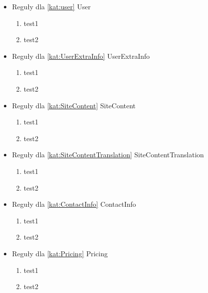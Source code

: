 \begin{itemize}[label={}]
    \setlength\itemsep{1em}
    \item Reguły dla \ref{kat:user} User
    \begin{enumerate}[label={\textbf{REG/\protect\threedigits{\arabic{enumi}}}}, wide, labelwidth=!]
        \item test1
        \item test2
    \end{enumerate}
    \item Reguły dla \ref{kat:UserExtraInfo} UserExtraInfo
    \begin{enumerate}[label={\textbf{REG/\protect\threedigits{\arabic{enumi}}}}, wide, labelwidth=!, resume]
        \item test1
        \item test2
    \end{enumerate}
    \item Reguły dla \ref{kat:SiteContent} SiteContent
    \begin{enumerate}[label={\textbf{REG/\protect\threedigits{\arabic{enumi}}}}, wide, labelwidth=!, resume]
        \item test1
        \item test2
    \end{enumerate}
    \item Reguły dla \ref{kat:SiteContentTranslation} SiteContentTranslation
    \begin{enumerate}[label={\textbf{REG/\protect\threedigits{\arabic{enumi}}}}, wide, labelwidth=!, resume]
        \item test1
        \item test2
    \end{enumerate}
    \item Reguły dla \ref{kat:ContactInfo} ContactInfo
    \begin{enumerate}[label={\textbf{REG/\protect\threedigits{\arabic{enumi}}}}, wide, labelwidth=!, resume]
        \item test1
        \item test2
    \end{enumerate}
    \item Reguły dla \ref{kat:Pricing} Pricing
    \begin{enumerate}[label={\textbf{REG/\protect\threedigits{\arabic{enumi}}}}, wide, labelwidth=!, resume]
        \item test1
        \item test2
    \end{enumerate}

\end{itemize}
